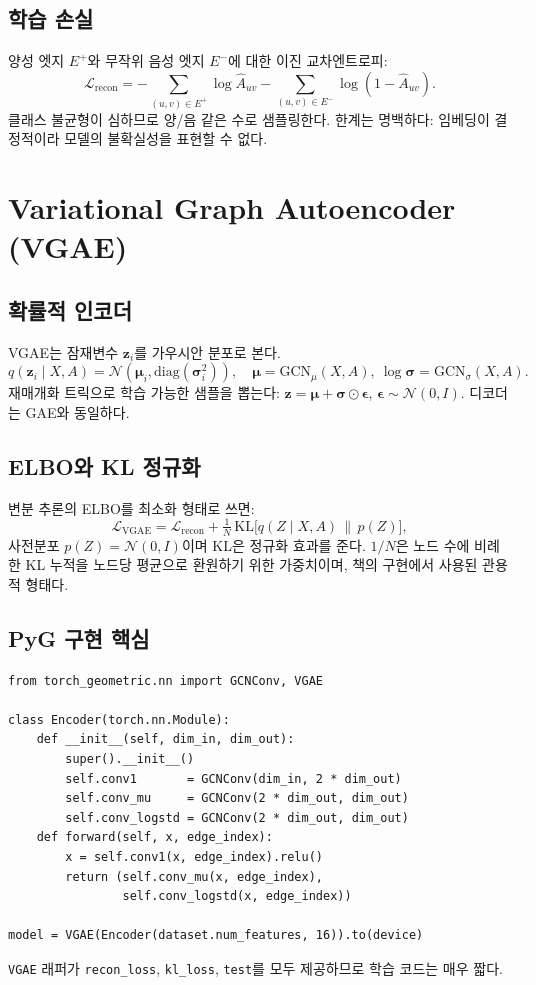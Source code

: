 \documentclass[11pt,a4paper]{article}
\begin{document}
\subsection{학습 손실}
양성 엣지 $E^+$와 무작위 음성 엣지 $E^-$에 대한 이진 교차엔트로피:
\begin{equation*}
  \mathcal{L}_{\text{recon}} =
   -\!\!\sum_{(u,v)\in E^{+}} \log \hat{A}_{uv}
   -\!\!\sum_{(u,v)\in E^{-}} \log(1-\hat{A}_{uv}).
\end{equation*}
클래스 불균형이 심하므로 양/음 같은 수로 샘플링한다. 한계는 명백하다: 임베딩이 결정적이라
모델의 불확실성을 표현할 수 없다.

\section{Variational Graph Autoencoder (VGAE)}
\subsection{확률적 인코더}
VGAE는 잠재변수 $\mathbf{z}_i$를 가우시안 분포로 본다.
\begin{equation*}
  q(\mathbf{z}_i\mid X,A) = \mathcal{N}(\bm{\mu}_i, \mathrm{diag}(\bm{\sigma}_i^2)),
  \quad
  \bm{\mu} = \mathrm{GCN}_{\mu}(X,A),\ \log\bm{\sigma} = \mathrm{GCN}_{\sigma}(X,A).
\end{equation*}
재매개화 트릭으로 학습 가능한 샘플을 뽑는다: $\mathbf{z} = \bm{\mu} + \bm{\sigma}\odot\bm{\epsilon}$, $\bm{\epsilon}\sim\mathcal{N}(0,I)$.
디코더는 GAE와 동일하다.

\subsection{ELBO와 KL 정규화}
변분 추론의 ELBO를 최소화 형태로 쓰면:
\begin{equation*}
  \mathcal{L}_{\text{VGAE}} = \mathcal{L}_{\text{recon}}
    + \tfrac{1}{N}\,\mathrm{KL}\bigl[q(Z\mid X,A)\,\|\,p(Z)\bigr],
\end{equation*}
사전분포 $p(Z)=\mathcal{N}(0,I)$이며 KL은 정규화 효과를 준다. $1/N$은 노드 수에 비례한 KL 누적을 노드당 평균으로
환원하기 위한 가중치이며, 책의 구현에서 사용된 관용적 형태다.

\subsection{PyG 구현 핵심}
\begin{lstlisting}
from torch_geometric.nn import GCNConv, VGAE

class Encoder(torch.nn.Module):
    def __init__(self, dim_in, dim_out):
        super().__init__()
        self.conv1       = GCNConv(dim_in, 2 * dim_out)
        self.conv_mu     = GCNConv(2 * dim_out, dim_out)
        self.conv_logstd = GCNConv(2 * dim_out, dim_out)
    def forward(self, x, edge_index):
        x = self.conv1(x, edge_index).relu()
        return (self.conv_mu(x, edge_index),
                self.conv_logstd(x, edge_index))

model = VGAE(Encoder(dataset.num_features, 16)).to(device)
\end{lstlisting}
\texttt{VGAE} 래퍼가 \texttt{recon\_loss}, \texttt{kl\_loss}, \texttt{test}를 모두 제공하므로
학습 코드는 매우 짧다.
\end{document}
